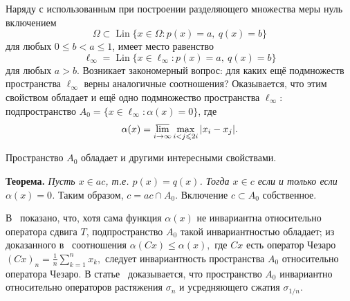 \documentclass[a4paper,14pt]{article}
\begin{document}
Наряду с использованным при построении разделяющего множества меры нуль включением
\begin{equation}
	\Omega \subset \operatorname{Lin}\{x\in\Omega : p(x) = a,~ q(x) = b\}
\end{equation}
для любых $0\leq b < a \leq 1$,
имеет место равенство
\begin{equation}
	\ell_\infty = \operatorname{Lin}\{x\in\ell_\infty : p(x) = a,~ q(x) = b\}
\end{equation}
для любых $a>b$.
Возникает закономерный вопрос: для каких ещё подмножеств пространства $\ell_\infty$
верны аналогичные соотношения?
Оказывается, что этим свойством обладает и ещё одно подмножество пространства $\ell_\infty$: подпространство
$A_0 = \{ x \in \ell_\infty : \alpha(x) =0 \}$,
где~\cite{our-vzms-2018}
\begin{equation*}
	\alpha(x) = \varlimsup_{i\to\infty} \max_{i<j\leqslant 2i} |x_i - x_j|
	.
\end{equation*}

Пространство $A_0$ обладает и другими интересными свойствами.


\textbf{Теорема.}{\cite[следствие 2]{our-mz2019ac0}}{\sl
	\label{thm:alpha_c_ac_c}
	Пусть $x\in ac$, т.е. $p(x) = q(x)$.
	Тогда $x\in c$ если и только если $\alpha(x) = 0$.
}
Таким образом, $c = ac \cap A_0$.
Включение $c\subset A_0$ собственное.

В~\cite{our-ped-2018-alpha-Tx} показано, что, хотя сама функция $\alpha(x)$ не инвариантна относительно оператора сдвига $T$,
подпространство $A_0$ такой инвариантностью обладает;
из доказанного в~\cite{SSUZ2} соотношения
$
	\alpha(Cx) \leq \alpha(x)
	,
$
где $Cx$ есть оператор Чезаро
$
	(Cx)_n = \frac{1}{n} \sum_{k=1}^n x_k
	,
$
следует инвариантность пространства $A_0$ относительно оператора Чезаро.
В статье~\cite{avdeev2021vestnik} доказывается,
что пространство $A_0$ инвариантно относительно операторов растяжения $\sigma_n$
и усредняющего сжатия $\sigma_{1/n}$.



\end{document}
